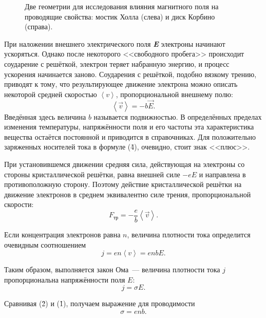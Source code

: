 \begin{figure}
	\caption{Две геометрии для исследования влияния магнитного поля на проводящие свойства: мостик Холла (слева) и диск Корбино (справа).}
	\label{fig2}
\end{figure}




При наложении внешнего электрического поля {\bf \it E} электроны начинают ускоряться. Однако после некоторого <<свободного пробега>> происходит соударение с решёткой, электрон теряет набранную энергию, и процесс ускорения начинается заново.
Соударения с решёткой, подобно вязкому трению, приводят к тому, что результирующее движение электрона можно описать
некоторой средней скоростью $\left< v \right> $, пропорциональной внешнему полю:
\begin{equation}
\left< \vec{v} \right>=-b\vec{E}.
\end{equation}
Введённая здесь величина $b$ называется \textsf{подвижностью}. В определённых пределах изменения температуры,
напряжённости поля и его частоты эта характеристика вещества остаётся постоянной и приводится в справочниках. Для
положительно заряженных носителей тока в формуле (\r4), очевидно, стоит знак <<плюс>>.

При установившемся движении средняя сила, действующая на электроны со стороны кристаллической решётки, равна внешней силе $-eE$ и направлена в противоположную сторону. Поэтому действие кристаллической решётки на движение электронов в среднем эквивалентно силе трения, пропорциональной скорости:
\begin{equation}
F_{тр}=-\frac{e}{b}\left<\vec{v}\right>.
\end{equation}

Если концентрация электронов равна $n$, величина плотности тока определится очевидным соотношением
\begin{equation}
j=en\left<v\right>=enbE.
\end{equation}

Таким образом, выполняется закон Ома~--- величина плотности тока $j$ пропорциональна напряжённости поля $E$:
\begin{equation}
j=\sigma E.
\end{equation}

Сравнивая (\r{2}) и (\r{1}), получаем выражение для проводимости
\begin{equation}
\sigma=enb.
\end{equation}

